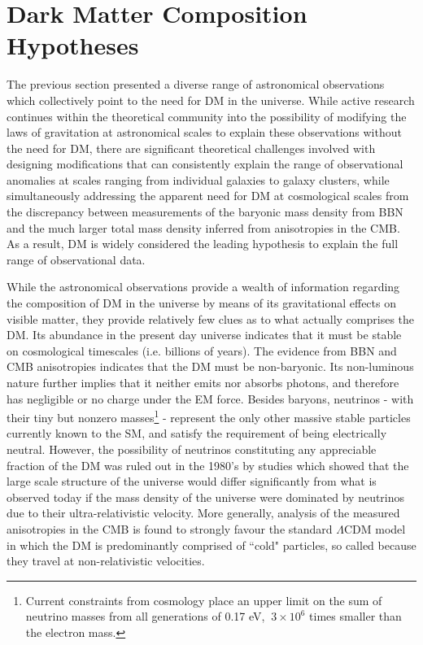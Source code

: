 \section{Dark Matter Composition Hypotheses}

The previous section presented a diverse range of astronomical observations which collectively point to the need for DM in the universe. While active research continues within the theoretical community \cite{mond_2012, mond_2021} into the possibility of modifying the laws of gravitation at astronomical scales to explain these observations without the need for DM, there are significant theoretical challenges involved with designing modifications that can consistently explain the range of observational anomalies at scales ranging from individual galaxies to galaxy clusters, while simultaneously addressing the apparent need for DM at cosmological scales from the discrepancy between measurements of the baryonic mass density from BBN and the much larger total mass density inferred from anisotropies in the CMB. As a result, DM is widely considered the leading hypothesis to explain the full range of observational data.

While the astronomical observations provide a wealth of information regarding the composition of DM in the universe by means of its gravitational effects on visible matter, they provide relatively few clues as to what actually comprises the DM. Its abundance in the present day universe indicates that it must be stable on cosmological timescales (i.e. billions of years). The evidence from BBN and CMB anisotropies indicates that the DM must be non-baryonic. Its non-luminous nature further implies that it neither emits nor absorbs photons, and therefore has negligible or no charge under the EM force. Besides baryons, neutrinos - with their tiny but nonzero masses\footnote{Current constraints from cosmology place an upper limit on the sum of neutrino masses from all generations of 0.17 eV, \(~3\times10^6\) times smaller than the electron mass.} - represent the only other massive stable particles currently known to the SM, and satisfy the requirement of being electrically neutral. However, the possibility of neutrinos constituting any appreciable fraction of the DM was ruled out in the 1980's by studies \cite{neutrino_dm} which showed that the large scale structure of the universe would differ significantly from what is observed today if the mass density of the universe were dominated by neutrinos due to their ultra-relativistic velocity. More generally, analysis of the measured anisotropies in the CMB \cite{Planck_2020} is found to strongly favour the standard \(\Lambda\)CDM model in which the DM is predominantly comprised of ``cold" particles, so called because they travel at non-relativistic velocities.

